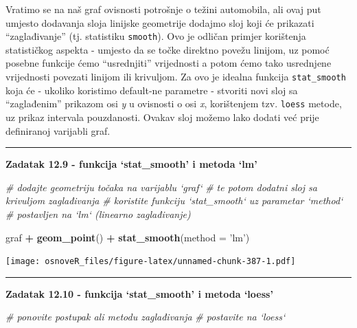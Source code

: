 \documentclass[]{book}
\newenvironment{Shaded}{\begin{snugshade}}{\end{snugshade}}
\newcommand{\KeywordTok}[1]{\textcolor[rgb]{0.13,0.29,0.53}{\textbf{#1}}}
\newcommand{\DataTypeTok}[1]{\textcolor[rgb]{0.13,0.29,0.53}{#1}}
\newcommand{\StringTok}[1]{\textcolor[rgb]{0.31,0.60,0.02}{#1}}
\newcommand{\CommentTok}[1]{\textcolor[rgb]{0.56,0.35,0.01}{\textit{#1}}}
\newcommand{\OperatorTok}[1]{\textcolor[rgb]{0.81,0.36,0.00}{\textbf{#1}}}
\newcommand{\NormalTok}[1]{#1}
\theoremstyle{definition}
\theoremstyle{definition}
\theoremstyle{definition}
\theoremstyle{remark}
\begin{document}
Vratimo se na naš graf ovisnosti potrošnje o težini automobila, ali ovaj
put umjesto dodavanja sloja linijske geometrije dodajmo sloj koji će
prikazati ``zaglađivanje'' (tj. statistiku \texttt{smooth}). Ovo je
odličan primjer korištenja statističkog aspekta - umjesto da se točke
direktno povežu linijom, uz pomoć posebne funkcije ćemo ``usrednjiti''
vrijednosti a potom ćemo tako usrednjene vrijednosti povezati linijom
ili krivuljom. Za ovo je idealna funkcija \texttt{stat\_smooth} koja će
- ukoliko koristimo default-ne parametre - stvoriti novi sloj sa
``zaglađenim'' prikazom osi \emph{y} u ovisnosti o osi \emph{x},
korištenjem tzv. \texttt{loess} metode, uz prikaz intervala pouzdanosti.
Ovakav sloj možemo lako dodati već prije definiranoj varijabli graf.

\begin{center}\rule{0.5\linewidth}{\linethickness}\end{center}

\textbf{Zadatak 12.9 - funkcija `stat\_smooth' i metoda `lm'}

\begin{Shaded}
\begin{Highlighting}[]
\CommentTok{# dodajte geometriju točaka na varijablu `graf`}
\CommentTok{# te potom dodatni sloj sa krivuljom zaglađivanja}
\CommentTok{# koristite funkciju `stat_smooth` uz parametar `method` }
\CommentTok{# postavljen na `lm` (linearno zaglađivanje)}
\end{Highlighting}
\end{Shaded}

\begin{Shaded}
\begin{Highlighting}[]
\NormalTok{graf }\OperatorTok{+}\StringTok{ }\KeywordTok{geom_point}\NormalTok{() }\OperatorTok{+}\StringTok{ }\KeywordTok{stat_smooth}\NormalTok{(}\DataTypeTok{method =} \StringTok{'lm'}\NormalTok{)}
\end{Highlighting}
\end{Shaded}

\texttt{[image: osnoveR\_files/figure-latex/unnamed-chunk-387-1.pdf]}

\begin{center}\rule{0.5\linewidth}{\linethickness}\end{center}

\textbf{Zadatak 12.10 - funkcija `stat\_smooth' i metoda `loess'}

\begin{Shaded}
\begin{Highlighting}[]
\CommentTok{# ponovite postupak ali metodu zaglađivanja}
\CommentTok{# postavite na `loess` }
\end{Highlighting}
\end{Shaded}
\end{document}
